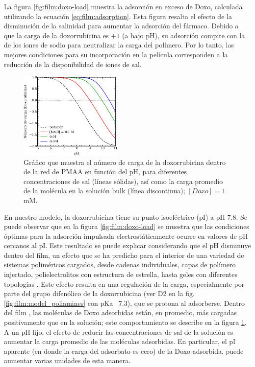 La figura  \ref{fig:film:doxo-load} muestra la adsorci\'on en exceso de Doxo, calculada utilizando la ecuaci\'on \ref{eq:film:adsorption}. Esta figura resalta el efecto de la disminuci\'on de la salinidad para aumentar la adsorci\'on del f\'armaco. Debido a que la carga de la doxorrubicina es $+1$ (a bajo pH), su adsorci\'on compite con la de los iones de sodio para neutralizar la carga del pol\'imero. Por lo tanto, las mejores condiciones para su incorporaci\'on en la pel\'icula corresponden a la reducci\'on de la disponibilidad de iones  de sal.


\begin{figure}[!htb]
	\centering
	\includegraphics[width=0.45\textwidth]{Figures/graph-film/doxo-charge.png}
	\caption{Gr\'afico que muestra el n\'umero de carga de la doxorrubicina dentro de la red de PMAA en funci\'on del pH, para diferentes concentraciones de sal (l\'ineas s\'olidas), as\'i como la carga promedio de la mol\'ecula en la soluci\'on bulk (l\'inea discontinua); $[Doxo]=1$ mM. }
	\label{fig:film:doxo-charge}
\end{figure}

En nuestro modelo, la doxorrubicina tiene su punto isoel\'ectrico (pI) a pH 7.8. Se puede observar que en  la figura  \ref{fig:film:doxo-load} se muestra que las condiciones \'optimas para la adsorci\'on impulsada electrost\'aticamente ocurre en valores de pH cercanos al pI. Este resultado se puede explicar considerando que el pH disminuye dentro del film, un efecto que se ha predicho para el interior de una variedad de sistemas polim\'ericos cargados, desde cadenas individuales, capas de pol\'imero injertado, polielectrolitos con estructura de estrella, hasta geles con diferentes topolog\'ias  \cite{nap2006weak,Borisov2011,Longo2011,polotsky2013collapse,Murmiliuk2018}. Este efecto resulta en una regulaci\'on de la carga, especialmente por parte del grupo difen\'olico de la doxorrubicina (ver D2 en la fig. \ref{fig:film:model_poliamines} con pKa~ 7.3), que se protona al adsorberse. Dentro del film , las mol\'eculas de Doxo adsorbidas est\'an, en promedio, m\'as cargadas positivamente que en la soluci\'on; este comportamiento se describe en la figura \ref{fig:film:doxo-charge}. A un pH fijo, el efecto de reducir las concentraciones de sal de la soluci\'on es aumentar la carga promedio de las mol\'eculas adsorbidas. En particular, el pI aparente (en donde la carga del adsorbato es cero) de la Doxo adsorbida, puede aumentar varias unidades de esta manera.


